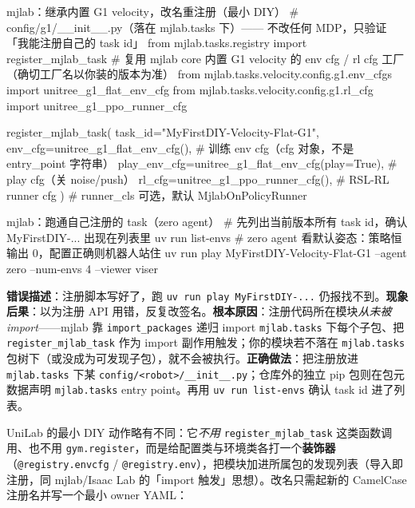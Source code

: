 \begin{codebox}[Python]{mjlab：继承内置 G1 velocity，改名重注册（最小 DIY）}
# config/g1/__init__.py（落在 mjlab.tasks 下）—— 不改任何 MDP，只验证「我能注册自己的 task id」
from mjlab.tasks.registry import register_mjlab_task
# 复用 mjlab core 内置 G1 velocity 的 env cfg / rl cfg 工厂（确切工厂名以你装的版本为准）
from mjlab.tasks.velocity.config.g1.env_cfgs import unitree_g1_flat_env_cfg
from mjlab.tasks.velocity.config.g1.rl_cfg import unitree_g1_ppo_runner_cfg

register_mjlab_task(
    task_id="MyFirstDIY-Velocity-Flat-G1",
    env_cfg=unitree_g1_flat_env_cfg(),                  # 训练 env cfg（cfg 对象，不是 entry_point 字符串）
    play_env_cfg=unitree_g1_flat_env_cfg(play=True),    # play cfg（关 noise/push）
    rl_cfg=unitree_g1_ppo_runner_cfg(),                 # RSL-RL runner cfg
)   # runner_cls 可选，默认 MjlabOnPolicyRunner
\end{codebox}

\begin{codebox}[bash]{mjlab：跑通自己注册的 task（zero agent）}
# 先列出当前版本所有 task id，确认 MyFirstDIY-... 出现在列表里
uv run list-envs
# zero agent 看默认姿态：策略恒输出 0，配置正确则机器人站住
uv run play MyFirstDIY-Velocity-Flat-G1 --agent zero --num-envs 4 --viewer viser
\end{codebox}

\begin{pitfall}
\textbf{错误描述}：注册脚本写好了，跑 \verb|uv run play MyFirstDIY-...| 仍报找不到。\textbf{现象后果}：以为注册 API 用错，反复改签名。\textbf{根本原因}：注册代码所在模块\emph{从未被 import}——mjlab 靠 \verb|import_packages| 递归 import \verb|mjlab.tasks| 下每个子包、把 \verb|register_mjlab_task| 作为 import 副作用触发；你的模块若不落在 \verb|mjlab.tasks| 包树下（或没成为可发现子包），就不会被执行。\textbf{正确做法}：把注册放进 \verb|mjlab.tasks| 下某 \verb|config/<robot>/__init__.py|；仓库外的独立 pip 包则在包元数据声明 \verb|mjlab.tasks| entry point。再用 \verb|uv run list-envs| 确认 task id 进了列表。
\end{pitfall}

UniLab 的最小 DIY 动作略有不同：它\emph{不用} \verb|register_mjlab_task| 这类函数调用、也不用 \verb|gym.register|，而是给配置类与环境类各打一个\textbf{装饰器}（\verb|@registry.envcfg| / \verb|@registry.env|），把模块加进所属包的发现列表（导入即注册，同 mjlab/Isaac Lab 的「import 触发」思想）。改名只需起新的 CamelCase 注册名并写一个最小 owner YAML：

